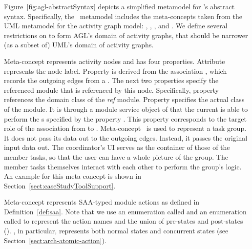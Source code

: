 Figure~\ref{fig:agl-abstractSyntax} depicts a simplified metamodel for \agl's abstract syntax. %
%
%
Specifically, the \agl~metamodel includes the meta-concepts taken from the UML metamodel for the activity graph model: , , , and . We define several restrictions on  to form AGL's domain of activity graphs, that should be narrower (as a subset of) UML's domain of activity graphs.

Meta-concept  represents activity nodes and has four properties. Attribute  represents the node label. 
Property  is derived from the association , which records the outgoing edges from a . The next two properties specify the referenced module that is referenced by this node. Specifically, property  references the domain class of the \textit{ref} module. 
%
Property  specifies the actual  class of the module. It is through a module service object of  that the current  is able to perform the s specified by the property . This property corresponds to the target role of the association from  to . Meta-concept~ is used to represent a task group. It does not pass its data out to the outgoing edges. Instead, it passes the original input data out. The coordinator's UI serves as the container of those of the member tasks, so that the user can have a whole picture of the group. The member tasks themselves interact with each other to perform the group's logic. An example for this meta-concept is shown in Section~\ref{sect:caseStudyToolSupport}.

Meta-concept  represents SAA-typed module actions as defined in Definition~\ref{def:saa}. Note that we use an enumeration called  and an enumeration called  to represent the action names and the union of pre-states and post-states (\resp). , in particular, represents both normal states and concurrent states (see Section~\ref{sect:arch-atomic-action}).

